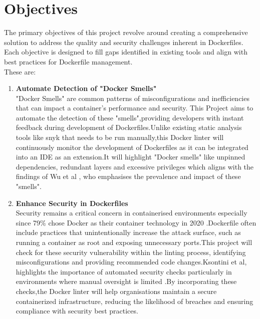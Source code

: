 \section{Objectives}
The primary objectives of this project revolve around creating a comprehensive solution to address the quality and security challenges inherent in Dockerfiles. Each objective is designed to fill gaps identified in existing tools and align with best practices for Dockerfile management.\\These are:
\begin{enumerate}
    \item \textbf{Automate Detection of "Docker Smells"}\\"Docker Smells" are common patterns of misconfigurations and inefficiencies that can impact a container's performance and security. This Project aims to automate the detection of these "smells",providing developers with instant feedback during development of Dockerfiles.Unlike existing static analysis tools like snyk that needs to be run manually,this Docker linter will continuously monitor the development of Dockerfiles as it can be integrated into an IDE as an extension.It will highlight "Docker smells" like unpinned dependencies, redundant layers and excessive privileges which aligns with the findings of Wu et al \cite{CharacterizingtheOccurrenceofDockerfile}, who emphasises the prevalence and impact of these "smells". 

    \item \textbf{Enhance Security in Dockerfiles}\\Security remains a critical concern in containerised environments especially since 79\% chose Docker as their container technology in 2020 \cite{CharacterizingtheOccurrenceofDockerfile}.Dockerfile often include practices that unintentionally increase the attack surface, such as running a container as root and exposing unnecessary ports.This project will check for these security vulnerability within the linting process, identifying misconfigurations and providing recommended code changes.Ksontini et al, highlights the importance of automated security checks particularly in environments where manual oversight is limited \cite{ksontini2021refactorings}.By incorporating these checks,the Docker linter will help organisations maintain a secure containerized infrastructure, reducing the likelihood of breaches and ensuring compliance with security best practices.


\end{enumerate}
